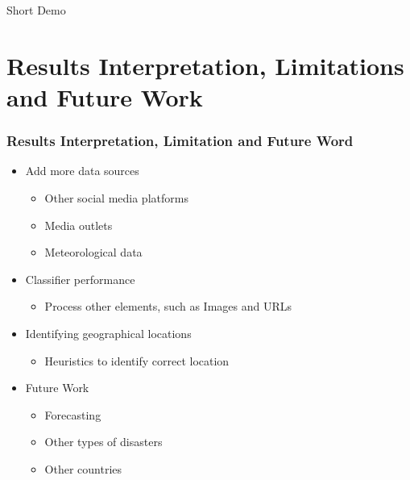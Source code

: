 \documentclass{beamer}
\begin{document}
    

  \begin{frame}
\begin{center}
\Huge Short Demo
\end{center}
  \end{frame}
\section{Results Interpretation, Limitations and Future Work}

\begin{frame}
  \frametitle{Results Interpretation, Limitation and Future Word}
  \begin{itemize}
    \item Add more data sources
      \begin{itemize}
      \item Other social media platforms
      \item Media outlets 
      \item Meteorological data
      \end{itemize}
   \item Classifier performance
     \begin{itemize}
     \item Process other elements, such as Images and URLs
     \end{itemize}
   \item Identifying geographical locations
      \begin{itemize}
    \item Heuristics to identify correct location
      \end{itemize}
    \item Future Work
    \begin{itemize}
      \item Forecasting 
      \item Other types of disasters
      \item Other countries
    \end{itemize}
  \end{itemize}
\end{frame}
\end{document}
